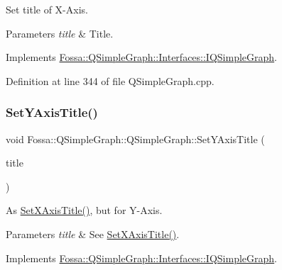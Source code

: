 Set title of X-\/\+Axis. 


\begin{DoxyParams}{Parameters}
{\em title} & Title. \\
\hline
\end{DoxyParams}


Implements \hyperlink{class_fossa_1_1_q_simple_graph_1_1_interfaces_1_1_i_q_simple_graph_adfca7d41a47790e8403507544468ba86}{Fossa\+::\+Q\+Simple\+Graph\+::\+Interfaces\+::\+I\+Q\+Simple\+Graph}.



Definition at line 344 of file Q\+Simple\+Graph.\+cpp.

\mbox{\label{class_fossa_1_1_q_simple_graph_1_1_q_simple_graph_a41c9e9d34744f6e6550ca97dc0d2f488}} 
\subsubsection{\texorpdfstring{Set\+Y\+Axis\+Title()}{SetYAxisTitle()}}
{\footnotesize\ttfamily void Fossa\+::\+Q\+Simple\+Graph\+::\+Q\+Simple\+Graph\+::\+Set\+Y\+Axis\+Title (\begin{DoxyParamCaption}\item[{Q\+String}]{title }\end{DoxyParamCaption})\hspace{0.3cm}{\ttfamily [virtual]}}



As \hyperlink{class_fossa_1_1_q_simple_graph_1_1_q_simple_graph_a7579da572b54d43ccec3d2bd572b6cfa}{Set\+X\+Axis\+Title()}, but for Y-\/\+Axis. 


\begin{DoxyParams}{Parameters}
{\em title} & See \hyperlink{class_fossa_1_1_q_simple_graph_1_1_q_simple_graph_a7579da572b54d43ccec3d2bd572b6cfa}{Set\+X\+Axis\+Title()}. \\
\hline
\end{DoxyParams}


Implements \hyperlink{class_fossa_1_1_q_simple_graph_1_1_interfaces_1_1_i_q_simple_graph_a606c07c40ed294cdd568de5488875af5}{Fossa\+::\+Q\+Simple\+Graph\+::\+Interfaces\+::\+I\+Q\+Simple\+Graph}.



